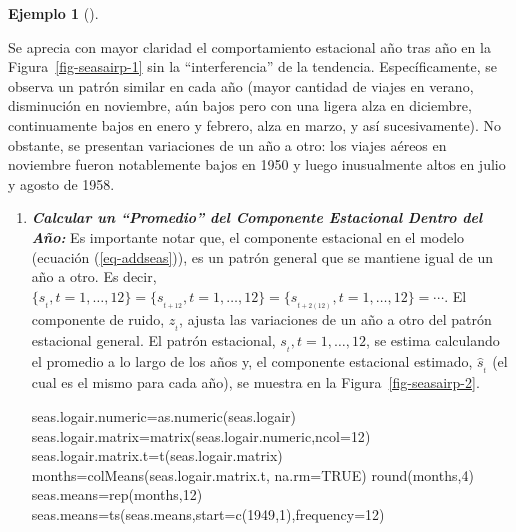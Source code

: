 \documentclass[
  us-letterpaper,
]{scrreprt}
\newenvironment{Shaded}{\begin{snugshade}}{\end{snugshade}}
\newcommand{\AttributeTok}[1]{\textcolor[rgb]{0.40,0.45,0.13}{#1}}
\newcommand{\ConstantTok}[1]{\textcolor[rgb]{0.56,0.35,0.01}{#1}}
\newcommand{\DecValTok}[1]{\textcolor[rgb]{0.68,0.00,0.00}{#1}}
\newcommand{\FunctionTok}[1]{\textcolor[rgb]{0.28,0.35,0.67}{#1}}
\newcommand{\NormalTok}[1]{\textcolor[rgb]{0.00,0.23,0.31}{#1}}
\newcommand{\OtherTok}[1]{\textcolor[rgb]{0.00,0.23,0.31}{#1}}
\theoremstyle{plain}
\theoremstyle{definition}
\theoremstyle{definition}
\newtheorem{example}{Ejemplo}[chapter]
\theoremstyle{plain}
\theoremstyle{remark}
\begin{document}
\begin{example}[]
\begin{tcolorbox}
Se aprecia con mayor claridad el comportamiento estacional año tras año
en la Figura~\ref{fig-seasairp-1} sin la ``interferencia'' de la
tendencia. Específicamente, se observa un patrón similar en cada año
(mayor cantidad de viajes en verano, disminución en noviembre, aún bajos
pero con una ligera alza en diciembre, continuamente bajos en enero y
febrero, alza en marzo, y así sucesivamente). No obstante, se presentan
variaciones de un año a otro: los viajes aéreos en noviembre fueron
notablemente bajos en 1950 y luego inusualmente altos en julio y agosto
de 1958.

\begin{enumerate}
\def\labelenumi{\alph{enumi}.}
\setcounter{enumi}{2}
\item
  \textbf{\emph{Calcular un ``Promedio'' del Componente Estacional
  Dentro del Año:}} Es importante notar que, el componente estacional en
  el modelo (ecuación (\ref{eq-addseas})), es un patrón general que se
  mantiene igual de un año a otro. Es
  decir,\(\{s_{_t}, t=1,\ldots,12\} = \{s_{_{t+12}},t=1,\ldots,12\} =\{s_{_{t+2(12)}}, t=1,\ldots,12\}=\cdots.\)
  El componente de ruido, \(z_{_t}\), ajusta las variaciones de un año a
  otro del patrón estacional general. El patrón estacional,
  \(s_{_t}, t=1,\ldots,12\), se estima calculando el promedio a lo largo
  de los años y, el componente estacional estimado, \(\hat{s}_{_t}\) (el
  cual es el mismo para cada año), se muestra en la
  Figura~\ref{fig-seasairp-2}.

\begin{Shaded}
\begin{Highlighting}[]
\NormalTok{seas.logair.numeric}\OtherTok{=}\FunctionTok{as.numeric}\NormalTok{(seas.logair)}
\NormalTok{seas.logair.matrix}\OtherTok{=}\FunctionTok{matrix}\NormalTok{(seas.logair.numeric,}\AttributeTok{ncol=}\DecValTok{12}\NormalTok{)}
\NormalTok{seas.logair.matrix.t}\OtherTok{=}\FunctionTok{t}\NormalTok{(seas.logair.matrix)}
\NormalTok{months}\OtherTok{=}\FunctionTok{colMeans}\NormalTok{(seas.logair.matrix.t, }\AttributeTok{na.rm=}\ConstantTok{TRUE}\NormalTok{)}
\FunctionTok{round}\NormalTok{(months,}\DecValTok{4}\NormalTok{)}
\NormalTok{seas.means}\OtherTok{=}\FunctionTok{rep}\NormalTok{(months,}\DecValTok{12}\NormalTok{)}
\NormalTok{seas.means}\OtherTok{=}\FunctionTok{ts}\NormalTok{(seas.means,}\AttributeTok{start=}\FunctionTok{c}\NormalTok{(}\DecValTok{1949}\NormalTok{,}\DecValTok{1}\NormalTok{),}\AttributeTok{frequency=}\DecValTok{12}\NormalTok{)}
\end{Highlighting}
\end{Shaded}


\end{enumerate}
\end{tcolorbox}
\end{example}
\end{document}
